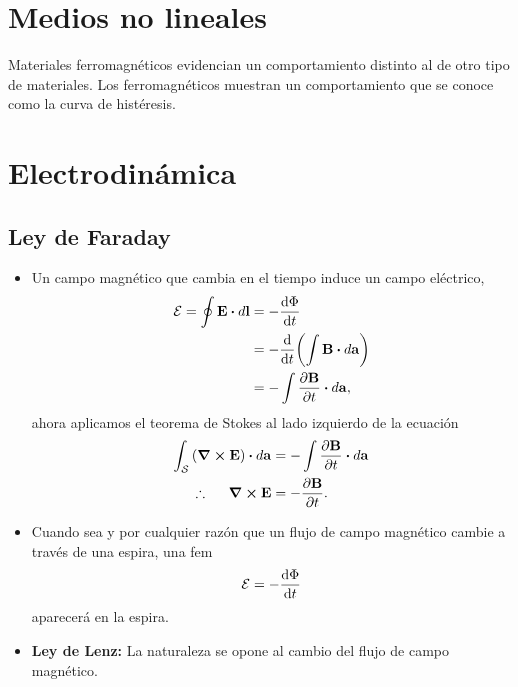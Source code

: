 \section{Medios no lineales}
Materiales ferromagnéticos evidencian un comportamiento distinto
al de otro tipo de materiales. Los ferromagnéticos muestran un comportamiento
que se conoce como la curva de histéresis. 

\section{Electrodinámica}
\subsection{Ley de Faraday}
\begin{itemize}
\item Un campo magnético que cambia en el tiempo induce un 
campo eléctrico,
\begin{align}
\E=\oint \vb{E}\vdot d\vb{l}&=-\dv{\Phi}{t}\\
&=-\dv{t}\qty(\int \vb{B}\vdot d\vb{a})\\
&=-\int \pdv{\vb{B}}{t}\vdot d\vb{a},
\end{align}
ahora aplicamos el teorema de Stokes al lado izquierdo de la ecuación
\begin{align}
\int _{\mathcal{S}} \qty(\curl{\vb{E}})\vdot d\vb{a}&=
-\int \pdv{\vb{B}}{t}\vdot d\vb{a}\\
\therefore \hspace{5mm} \curl{\vb{E}&=-\pdv{\vb{B}}{t}}.
\end{align}

\item Cuando sea y por cualquier razón que un flujo de campo 
magnético cambie a través de una espira, una fem
\begin{align}
\mathcal{E} = -\dv{\Phi}{t}
\end{align}
aparecerá en la espira.	

\item \textbf{Ley de Lenz:} La naturaleza se opone al cambio del 
flujo de campo magnético.
\end{itemize}

